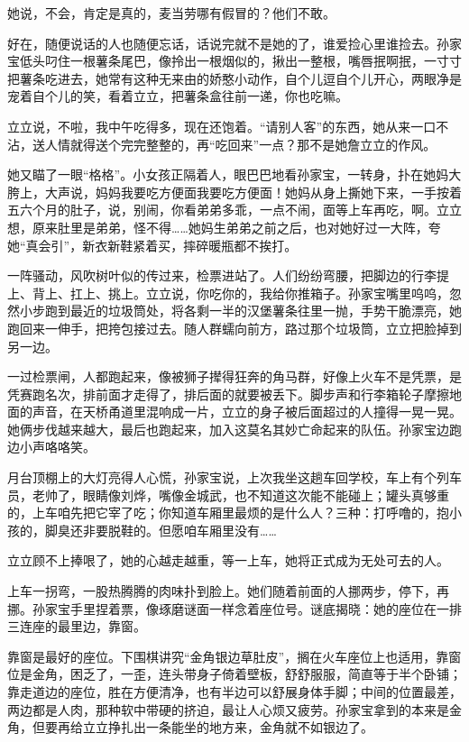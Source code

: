 \documentclass[lang=cn,newtx,12pt,scheme=chinese]{elegantbook}
\begin{document}
她说，不会，肯定是真的，麦当劳哪有假冒的？他们不敢。

好在，随便说话的人也随便忘话，话说完就不是她的了，谁爱捡心里谁捡去。孙家宝低头叼住一根薯条尾巴，像拎出一根烟似的，揪出一整根，嘴唇抿啊抿，一寸寸把薯条吃进去，她常有这种无来由的娇憨小动作，自个儿逗自个儿开心，两眼净是宠着自个儿的笑，看着立立，把薯条盒往前一递，你也吃嘛。

立立说，不啦，我中午吃得多，现在还饱着。“请别人客”的东西，她从来一口不沾，送人情就得送个完完整整的，再“吃回来”一点？那不是她詹立立的作风。

她又瞄了一眼“格格”。小女孩正隔着人，眼巴巴地看孙家宝，一转身，扑在她妈大胯上，大声说，妈妈我要吃方便面我要吃方便面！她妈从身上撕她下来，一手按着五六个月的肚子，说，别闹，你看弟弟多乖，一点不闹，面等上车再吃，啊。立立想，原来肚里是弟弟，怪不得……她妈生弟弟之前之后，也对她好过一大阵，夸她“真会引”，新衣新鞋紧着买，摔碎暖瓶都不挨打。

一阵骚动，风吹树叶似的传过来，检票进站了。人们纷纷弯腰，把脚边的行李提上、背上、扛上、挑上。立立说，你吃你的，我给你推箱子。孙家宝嘴里呜呜，忽然小步跑到最近的垃圾筒处，将各剩一半的汉堡薯条往里一抛，手势干脆漂亮，她跑回来一伸手，把挎包接过去。随人群蠕向前方，路过那个垃圾筒，立立把脸掉到另一边。

一过检票闸，人都跑起来，像被狮子撵得狂奔的角马群，好像上火车不是凭票，是凭赛跑名次，排前面才走得了，排后面的就要被丢下。脚步声和行李箱轮子摩擦地面的声音，在天桥甬道里混响成一片，立立的身子被后面超过的人撞得一晃一晃。她俩步伐越来越大，最后也跑起来，加入这莫名其妙亡命起来的队伍。孙家宝边跑边小声咯咯笑。

月台顶棚上的大灯亮得人心慌，孙家宝说，上次我坐这趟车回学校，车上有个列车员，老帅了，眼睛像刘烨，嘴像金城武，也不知道这次能不能碰上；罐头真够重的，上车咱先把它宰了吃；你知道车厢里最烦的是什么人？三种：打呼噜的，抱小孩的，脚臭还非要脱鞋的。但愿咱车厢里没有……

立立顾不上捧哏了，她的心越走越重，等一上车，她将正式成为无处可去的人。

上车一拐弯，一股热腾腾的肉味扑到脸上。她们随着前面的人挪两步，停下，再挪。孙家宝手里捏着票，像琢磨谜面一样念着座位号。谜底揭晓：她的座位在一排三连座的最里边，靠窗。

靠窗是最好的座位。下围棋讲究“金角银边草肚皮”，搁在火车座位上也适用，靠窗位是金角，困乏了，一歪，连头带身子倚着壁板，舒舒服服，简直等于半个卧铺；靠走道边的座位，胜在方便清净，也有半边可以舒展身体手脚；中间的位置最差，两边都是人肉，那种软中带硬的挤迫，最让人心烦又疲劳。孙家宝拿到的本来是金角，但要再给立立挣扎出一条能坐的地方来，金角就不如银边了。
\end{document}
